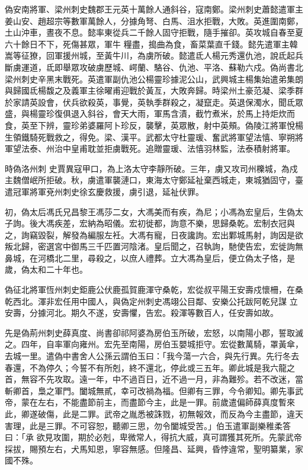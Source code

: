 \begin{pinyinscope}
 偽安南將軍、梁州刺史魏郡王元英十萬餘人通斜谷，寇南鄭。梁州刺史蕭懿遣軍主姜山安、趙超宗等數軍萬餘人，分據角弩、白馬、沮水拒戰，大敗。英進圍南鄭，土山沖車，晝夜不息。懿率東從兵二千餘人固守拒戰，隨手摧卻。英攻城自春至夏六十餘日不下，死傷甚眾，軍牛
 糧盡，搗曲為食，畜菜葉直千錢。懿先遣軍主韓嵩等征獠，回軍援州城，至黃牛川，為虜所破。懿遣氐人楊元秀還仇池，說氐起兵斷虜運道，氐即舉眾攻破虜歷城、崿蘭、駱谷、仇池、平洛、蘇勒六戍。偽尚書北梁州刺史辛黑末戰死。英遣軍副仇池公楊靈珍據泥公山，武興城主楊集始遣弟集朗與歸國氐楊馥之及義軍主徐曜甫迎戰於黃亙，大敗奔歸。時梁州土豪范凝、梁季群於家請英設會，伏兵欲殺英，事覺，英執季群殺之，凝竄走。英退保濁水，聞氐眾盛，與楊靈珍復俱退入斜谷，會天大雨，軍馬含漬，截竹煮米，於馬上持炬炊而食，英至下辨，靈珍弟婆羅阿卜珍反，襲擊，英眾散，射中英頰。偽陵江將軍悅楊生領鐵騎死戰救之，得免。梁、漢平。武都太守杜靈瑗、奮武將軍望法憘、寧朔將軍望法泰、州治中皇甫耽並拒虜戰死。追贈靈瑗、法憘羽林監，法泰積射將軍。



 時偽洛州刺
 史賈異寇甲口，為上洛太守李靜所破。三年，虜又攻司州櫟城，為戍主魏僧岷所拒破。秋，虜遣軍襲漣口，東海太守鄭延祉棄西城走，東城猶固守，臺遣冠軍將軍兗州刺史徐玄慶救援，虜引退，延祉伏罪。



 初，偽太后馮氏兄昌黎王馮莎二女，大馮美而有疾，為尼；小馮為宏皇后，生偽太子詢。後大馮疾差，宏納為昭儀。宏初徙都，詢意不樂，思歸桑乾。宏制衣冠與之，詢竊毀裂，解發為編服左衽。大馮有寵，日夜讒詢。宏出鄴城馬射，詢因是欲叛北歸，密選宮中御馬三千匹置河陰渚。皇后聞之，召執詢，馳使告宏，宏徙詢無鼻城，在河橋北二里，尋殺之，以庶人禮葬。立大馮為皇后，便立偽太子恪，是歲，偽太和二十年也。



 偽征北將軍恆州刺史鉅鹿公伏鹿孤賀鹿渾守桑乾，宏從叔平陽王安壽戍懷柵，在桑乾西北。渾非宏任用中國人，與偽定州刺史馮翊公目鄰、安樂公托跋阿乾兒謀
 立安壽，分據河北。期久不遂，安壽懼，告宏。殺渾等數百人，任安壽如故。



 先是偽荊州刺史薛真度、尚書卻祁阿婆為房伯玉所破，宏怒，以南陽小郡，誓取滅之。四年，自率軍向雍州。宏先至南陽，房伯玉嬰城拒守。宏從數萬騎，罩黃傘，去城一里。遣偽中書舍人公孫云謂伯玉曰：「我今蕩一六合，與先行異。先行冬去春還，不為停久；今誓不有所剋，終不還北，停此或三五年。卿此城是我六龍之首，無容不先攻取。遠一年，中不過百日，近不過一月，非為難殄。若不改迷，當斬卿首，梟之軍門。闔城無貳，幸可改禍為福。但卿有三罪，今令卿知。卿先事武帝，蒙在左右，不能盡節前主，而盡節今主，此是一罪。前歲遣偏師薛真度暫來此，卿遂破傷，此是二罪。武帝之胤悉被誅戮，初無報效，而反為今主盡節，違天害理，此是三罪。不可容恕，聽卿三思，勿令闔城受苦。」伯玉遣軍副樂稚柔答曰：「承
 欲見攻圍，期於必剋，卑微常人，得抗大威，真可謂獲其死所。先蒙武帝採拔，賜預左右，犬馬知恩，寧容無感。但隆昌、延興，昏悖違常，聖明纂業，家國不殊。




\end{pinyinscope}
